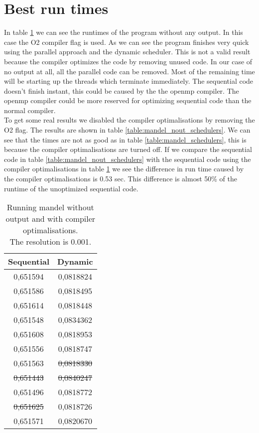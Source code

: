 \documentclass[a4paper]{article}
\begin{document}
\section{Best run times}
	In table \ref{table:mandel_nout_o3} we can see the runtimes of the program without any output.
	In this case the O2 compiler flag is used.
	As we can see the program finishes very quick using the parallel approach and the dynamic scheduler.
	This is not a valid result because the compiler optimizes the code by removing unused code.
	In our case of no output at all, all the parallel code can be removed.
	Most of the remaining time will be starting up the threads which terminate immediately.
	The sequential code doesn't finish instant, this could be caused by the the openmp compiler.
	The openmp compiler could be more reserved for optimizing sequential code than the normal compiler.\\
	To get some real results we disabled the compiler optimalisations by removing the O2 flag.
	The results are shown in table \ref{table:mandel_nout_schedulers}.
	We can see that the times are not as good as in table \ref{table:mandel_schedulers}, this is because the compiler optimalisations are turned off.
	If we compare the sequential code in table \ref{table:mandel_nout_schedulers} with the sequential code using the compiler optimalisations in table \ref{table:mandel_nout_o3}
	we see the difference in run time caused by the compiler optimalisations is 0.53 sec.
	This difference is almost 50\% of the runtime of the unoptimized sequential code.\\
	
	\begin{table}[h]
		\caption{Running mandel without output and with compiler optimalisations.\\The resolution is 0.001.}
		\label{table:mandel_nout_o3}
		\begin{center}
			\begin{tabular}{| c | c |}
				\hline
				Sequential & Dynamic\\ 
				\hline
				0,651594 & 0,0818824\\ 
				0,651586 & 0,0818495\\ 
				0,651614 & 0,0818448\\ 
				0,651548 & 0,0834362\\ 
				0,651608 & 0,0818953\\ 
				0,651556 & 0,0818747\\ 
				0,651563 & \st{0,0818330}\\ 
				\st{0,651443} & \st{0,0840247}\\ 
				0,651496 & 0,0818772\\ 
				\st{0,651625} & 0,0818726\\ 
				\hline
				0,651571 & 0,0820670\\ 
				\hline
			\end{tabular}
		\end{center}
	\end{table}
	
\end{document}

